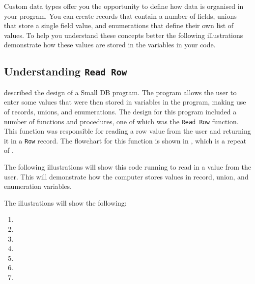 Custom data types offer you the opportunity to define how data is organised in your program. You can create records that contain a number of fields, unions that store a single field value, and enumerations that define their own list of values. To help you understand these concepts better the following illustrations demonstrate how these values are stored in the variables in your code.

\subsection{Understanding \texttt{Read Row}} %
\label{ssub:understanding_read row}

  described the design of a Small DB program. The program allows the user to enter some values that were then stored in variables in the program, making use of records, unions, and enumerations. The design for this program included a number of functions and procedures, one of which was the \texttt{Read Row} function. This function was responsible for reading a row value from the user and returning it in a \texttt{Row} record. The flowchart for this function is shown in , which is a repeat of .

The following illustrations will show this code running to read in a value from the user. This will demonstrate how the computer stores values in record, union, and enumeration variables.

The illustrations will show the following:
\begin{enumerate}
  \item {}
  \item {}
  \item {}
  \item {}
  \item {}
  \item {}
  \item {}
\end{enumerate}

